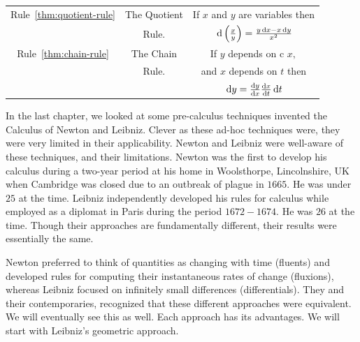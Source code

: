 \begin{table}
\begin{tabular}{ |c|c|c| }
    \hline{}
\small    Rule~\ref{thm:quotient-rule}&\small    The Quotient        &\small If $x$ and $y$ are variables then\\
    &\small           Rule.        &\small  $\thinspace{\rm d}\left(\frac{x}{y}\right) = \frac{y\thinspace{\rm d}x
      - x\thinspace{\rm d}y}{x^2}$\\
    \hline
\small    Rule~\ref{thm:chain-rule}&\small    The Chain        &\small If $y$ depends on
c    $x,$ \\
    &\small    Rule.            &\small and $x$ depends on $t$ then\\
    &\small                     &\small  $\thinspace{\rm d}y = \frac{\text{d}{y}}{\text{d}{x}}\frac{\text{d}{x}}{\text{d}{t}}\thinspace{\rm d}t$\\[2mm]
    \hline
  \end{tabular}
\end{table}
In the last chapter, we looked at some pre-calculus techniques
invented the Calculus of Newton and Leibniz.  Clever as these ad-hoc
techniques were, they were very limited in their applicability.
Newton and Leibniz were well-aware of these techniques, and their
limitations. Newton was the first to develop his calculus during a
two-year period at his home in Woolsthorpe, Lincolnshire, UK when
Cambridge was closed due to an outbreak of plague in $1665.$ He was
under $25$ at the time.  Leibniz independently developed his rules for
calculus while employed as a diplomat in Paris during the period
$1672-1674.$ He was $26$ at the time. Though their approaches are
fundamentally different, their results were essentially the same.

Newton preferred to think of quantities as changing with time
(fluents) and developed rules for computing their instantaneous rates
of change (fluxions), whereas Leibniz focused on infinitely small
differences (differentials).  They and their contemporaries,
recognized that these different approaches were equivalent. We will
eventually see this as well.  Each approach has its advantages.  We
will start with Leibniz's geometric approach.

